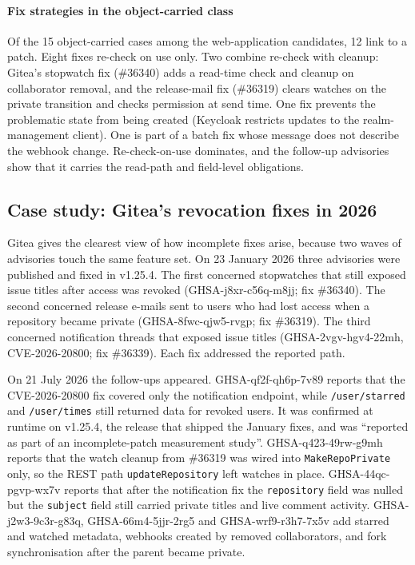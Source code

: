 \documentclass[preprint,12pt]{elsarticle}
\begin{document}
\paragraph{Fix strategies in the object-carried class}
Of the 15 object-carried cases among the web-application candidates, 12 link to a patch. Eight fixes re-check on use only. Two combine re-check with
cleanup: Gitea's stopwatch fix (\#36340) adds a read-time check and cleanup on collaborator removal, and
the release-mail fix (\#36319) clears watches on the private transition and checks permission at send time. One fix
prevents the problematic state from being created (Keycloak restricts updates to the realm-management client). One
is part of a batch fix whose message does not describe the webhook change. Re-check-on-use dominates, and the
follow-up advisories show that it carries the read-path and field-level obligations.

\subsection{Case study: Gitea's revocation fixes in 2026}\label{sec:gitea}
Gitea gives the clearest view of how incomplete fixes arise, because two waves of advisories touch the same
feature set. On 23 January 2026 three advisories were published and fixed in v1.25.4. The first concerned stopwatches
that still exposed issue titles after access was revoked (GHSA-j8xr-c56q-m8jj; fix \#36340). The second concerned release
e-mails sent to users who had lost access when a repository became private (GHSA-8fwc-qjw5-rvgp; fix \#36319). The
third concerned notification threads that exposed issue titles (GHSA-2vgv-hgv4-22mh, CVE-2026-20800; fix \#36339). Each
fix addressed the reported path.

On 21 July 2026 the follow-ups appeared. GHSA-qf2f-qh6p-7v89 reports that the CVE-2026-20800 fix covered only the notification
endpoint, while \texttt{/user/starred} and \texttt{/user/times} still returned data for revoked users. It was confirmed at
runtime on v1.25.4, the release that shipped the January fixes, and was ``reported as part of an incomplete-patch
measurement study''. GHSA-q423-49rw-g9mh reports that the watch cleanup from \#36319 was wired into \texttt{MakeRepoPrivate}
only, so the REST path \texttt{updateRepository} left watches in place. GHSA-44qc-pgvp-wx7v reports that after the notification
fix the \texttt{repository} field was nulled but the \texttt{subject} field still carried private titles and live
comment activity. GHSA-j2w3-9c3r-g83q, GHSA-66m4-5jjr-2rg5 and GHSA-wrf9-r3h7-7x5v add starred and watched metadata,
webhooks created by removed collaborators, and fork synchronisation after the parent became private.
\end{document}
